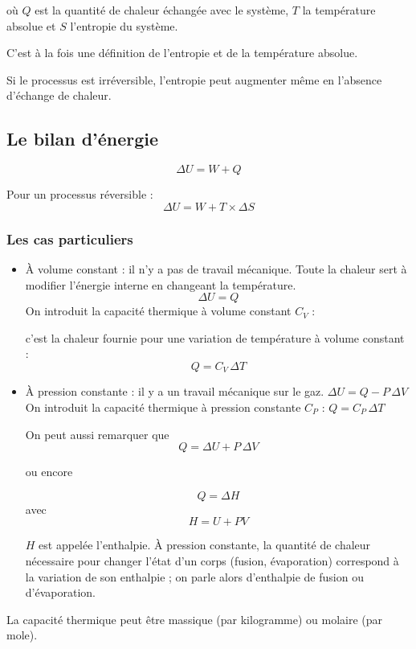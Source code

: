 \documentclass[11pt]{article}
\begin{document}
	où $Q$ est la quantité de chaleur échangée avec le système, $T$ la température absolue et $S$ l'entropie du système.
	
	C'est à la fois une définition de l'entropie et de la température absolue.
	
	Si le processus est irréversible, l'entropie peut augmenter même en l'absence d'échange de chaleur.
	
	\subsection*{Le bilan d’énergie}
	
	\[
	\Delta U = W + Q
	\]
	
	Pour un processus réversible :
	\[
	\Delta U = W + T \times \Delta S 
	\]
	
	\subsubsection*{Les cas particuliers}
	
	\begin{itemize}
		\item À volume constant : il n'y a pas de travail mécanique. Toute la chaleur sert à modifier l'énergie interne en changeant la température.
		\[
		\Delta U = Q
		\]
		On introduit la capacité thermique à volume constant $C_V$ :
		
		c'est la chaleur fournie pour une variation de température à volume constant :
		\[
		Q = C_V \,\Delta T
		\]
		
		\item À pression constante : il y a un travail mécanique sur le gaz.
		$
		\Delta U = Q - P\,\Delta V
	$
		On introduit la capacité thermique à pression constante $C_P$ :
	$
		Q = C_P \,\Delta T
$
		
		On peut aussi remarquer que
\[	Q = \Delta U + P\,\Delta V	\]
	

		
		ou encore
	
		\[ Q = \Delta H \]  avec  \[ H = U + PV\]
	
		
		$H$ est appelée l'enthalpie. À pression constante, la quantité de chaleur nécessaire pour changer l'état d'un corps (fusion, évaporation) correspond à la variation de son enthalpie ; on parle alors d'enthalpie de fusion ou d'évaporation.
	\end{itemize}
	
	La capacité thermique peut être massique (par kilogramme) ou molaire (par mole).
	
\end{document}
